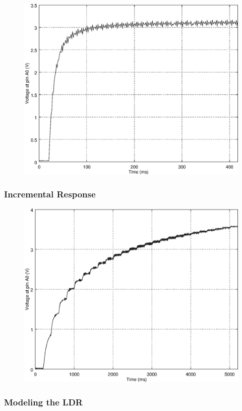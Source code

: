 \begin{figure}[h]
    \centering
    \includegraphics[width=.85\textwidth]{img/step_response_no_capacitor}
    \caption{}
    \label{fig:step_response_no_capacitor}
\end{figure}

\subsubsection{Incremental Response}
\label{sub:IncrementalResponse}

\begin{figure}[h]
    \centering
    \includegraphics[width=.85\textwidth]{img/incstep_response}
    \caption{}
    \label{fig:incstep_response}
\end{figure}

\subsubsection{Modeling the LDR}
\label{subsubsec:LDR_model}

